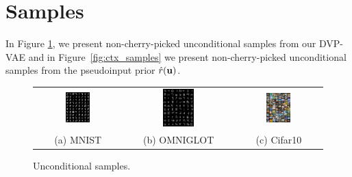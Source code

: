 \newpage
\section{Samples}\label{appendix:samples}

In Figure \ref{fig:all_samples}, we present non-cherry-picked unconditional samples from our DVP-VAE and in Figure~\ref{fig:ctx_samples} we present non-cherry-picked unconditional samples from the pseudoinput prior $\hat{r}({\mathbf{u}})$.

\begin{figure}[!htbp]
    \centering
    \begin{tabular}{ccc}
    \includegraphics[width=0.3\textwidth]{pics/5_dvp/mnist_samples_t0.7.pdf} &  
        \includegraphics[width=0.3\textwidth]{pics/5_dvp/omniglot_samples_t0.7.pdf} & 
        \includegraphics[width=0.3\textwidth]{pics/5_dvp/cifar10_samples_t0.7.pdf}\\
        (a) MNIST  & (b) OMNIGLOT & (c) Cifar10\\
    \end{tabular}
    \caption{Unconditional samples.}
    \label{fig:all_samples}
\end{figure}

